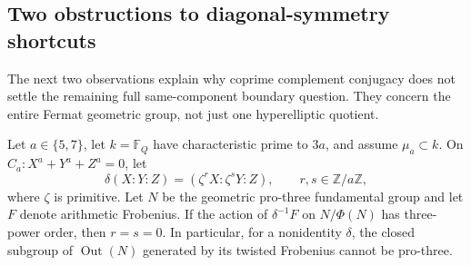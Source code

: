 \subsection{Two obstructions to diagonal-symmetry shortcuts}
\label{subsec:ff3-diagonal-shortcuts}

The next two observations explain why coprime complement conjugacy
does not settle the remaining full same-component boundary question.
They concern the entire Fermat geometric group, not just one
hyperelliptic quotient.

\begin{proposition}
\label{prop:ff3-diagonal-twist-obstruction}
Let $a\in\{5,7\}$, let $k=\mathbb F_Q$ have characteristic prime
to $3a$, and assume $\mu_a\subset k$.  On
$C_a:X^a+Y^a+Z^a=0$, let
\[
 \delta(X:Y:Z)=(\zeta^rX:\zeta^sY:Z),\qquad
 r,s\in\mathbb Z/a\mathbb Z,
\]
where $\zeta$ is primitive.  Let $N$ be the geometric pro-three
fundamental group and let $F$ denote arithmetic Frobenius.
If the action of $\delta^{-1}F$ on $N/\Phi(N)$ has three-power
order, then $r=s=0$.
In particular, for a nonidentity $\delta$, the closed subgroup of
$\operatorname{Out}(N)$ generated by its twisted Frobenius cannot
be pro-three.
\end{proposition}

